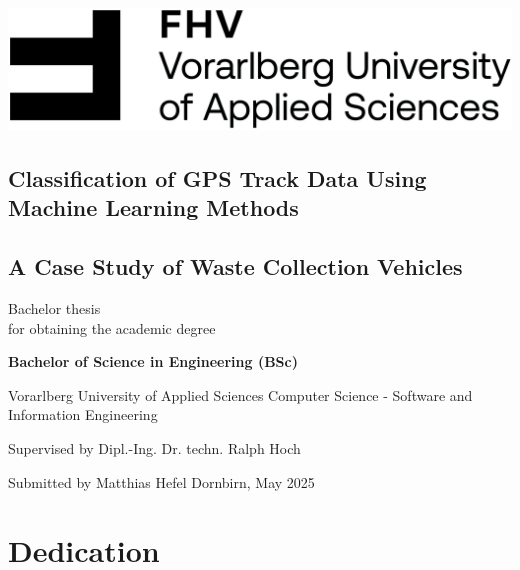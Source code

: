 \documentclass[a4paper,12pt,twoside]{scrreprt}
\begin{document}
\cleardoublepage   %
\thispagestyle{empty}
\begin{titlepage}
  \begin{flushright}
    \includegraphics[width=0.4\linewidth]{Abbildungen/Wort-Bild-Marke-cmyk}
  \end{flushright}
  \begin{flushleft}
    \section*{Classification of GPS Track Data Using Machine Learning Methods}
    \subsection*{A Case Study of Waste Collection Vehicles}
    \vspace{1cm}

    Bachelor thesis\\
    for obtaining the academic degree
    \vspace{0.5cm}

    \textbf{Bachelor of Science in Engineering (BSc)}

    \vspace{1cm}
    Vorarlberg University of Applied Sciences\newline
    Computer Science - Software and Information Engineering

    \vspace{0.5cm}

    Supervised by\newline
    Dipl.-Ing. Dr. techn. Ralph Hoch

    \vspace{0.5cm}

    Submitted by\newline
    Matthias Hefel\newline
    Dornbirn, May 2025
  \end{flushleft}
\end{titlepage}

\newpage

\section*{Dedication}
\end{document}
